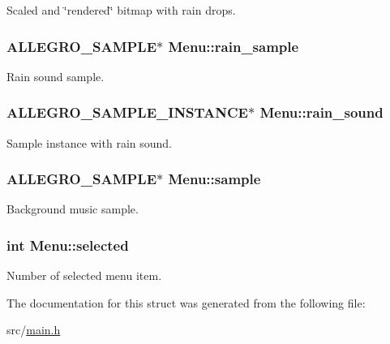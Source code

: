 \-Scaled and \char`\"{}rendered\char`\"{} bitmap with rain drops. \hypertarget{structMenu_ad14705d9172d76dc241de8f4657254cc}{
\subsubsection[{rain\-\_\-sample}]{\setlength{\rightskip}{0pt plus 5cm}\-A\-L\-L\-E\-G\-R\-O\-\_\-\-S\-A\-M\-P\-L\-E$\ast$ {\bf \-Menu\-::rain\-\_\-sample}}}\label{structMenu_ad14705d9172d76dc241de8f4657254cc}
\-Rain sound sample. \hypertarget{structMenu_a31b58f4005206ba8ecc4b6f40223295f}{
\subsubsection[{rain\-\_\-sound}]{\setlength{\rightskip}{0pt plus 5cm}\-A\-L\-L\-E\-G\-R\-O\-\_\-\-S\-A\-M\-P\-L\-E\-\_\-\-I\-N\-S\-T\-A\-N\-C\-E$\ast$ {\bf \-Menu\-::rain\-\_\-sound}}}\label{structMenu_a31b58f4005206ba8ecc4b6f40223295f}
\-Sample instance with rain sound. \hypertarget{structMenu_a19a25811d2d08b8fa1d1819088168b72}{
\subsubsection[{sample}]{\setlength{\rightskip}{0pt plus 5cm}\-A\-L\-L\-E\-G\-R\-O\-\_\-\-S\-A\-M\-P\-L\-E$\ast$ {\bf \-Menu\-::sample}}}\label{structMenu_a19a25811d2d08b8fa1d1819088168b72}
\-Background music sample. \hypertarget{structMenu_a608e2768a5458057048bf1c7ab9a81aa}{
\subsubsection[{selected}]{\setlength{\rightskip}{0pt plus 5cm}int {\bf \-Menu\-::selected}}}\label{structMenu_a608e2768a5458057048bf1c7ab9a81aa}
\-Number of selected menu item. 

\-The documentation for this struct was generated from the following file\-:\begin{DoxyCompactItemize}
\item 
src/\hyperlink{main_8h}{main.\-h}\end{DoxyCompactItemize}
